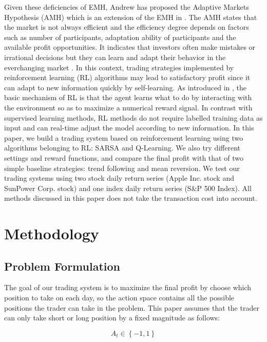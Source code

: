 \documentclass{article}
\begin{document}
\indent Given these deficiencies of EMH, Andrew has proposed the Adaptive Markets Hypothesis (AMH) which is an extension of the EMH in \cite{lo2005reconciling}. The AMH states that the market is not always efficient and the efficiency degree depends on factors such as number of participants, adaptation ability of participants and the available profit opportunities. It indicates that investors often make mistakes or irrational decisions but they can learn and adapt their behavior in the everchanging market \cite{corazza2015q}. In this context, trading strategies implemented by reinforcement learning (RL) algorithms may lead to satisfactory profit since it can adapt to new information quickly by self-learning. As introduced in \cite{sutton2018reinforcement}, the basic mechanism of RL is that the agent learns what to do by interacting with the environment so as to maximize a numerical reward signal. In contrast with supervised learning methods, RL methods do not require labelled training data as input and can real-time adjust the model according to new information. In this paper, we build a trading system based on reinforcement learning using two algorithms belonging to RL: SARSA and Q-Learning. We also try different settings and reward functions, and compare the final profit with that of two simple baseline strategies: trend following and mean reversion. We test our trading systems using two stock daily return series (Apple Inc. stock and SunPower Corp. stock) and one index daily return series (S\&P 500 Index). All methods discussed in this paper does not take the transaction cost into account.

\section{Methodology}

\subsection{Problem Formulation} %

\noindent The goal of our trading system is to maximize the final profit by choose which position to take on each day, so the action space contains all the possible positions the trader can take in the problem. This paper assumes that the trader can only take short or long position by a fixed magnitude as follows:

\begin{equation}
	A_{t} \in \left \{ -1, 1 \right \}
\end{equation}
\end{document}
